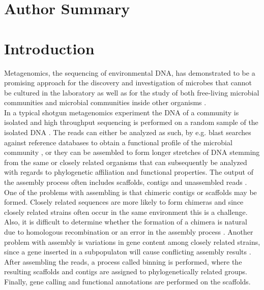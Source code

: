 \section*{Author Summary}



\section*{Introduction}
Metagenomics, the sequencing of environmental DNA, has demonstrated to be a
promising approach for the discovery and investigation of microbes that cannot
be cultured in the laboratory \cite{Eisen17355177} as well as for the study of
both free-living microbial communities \cite{Andersson18497291} and microbial
communities inside other organisms \cite{Qin20203603,Hess21273488}.\\


In a typical shotgun metagenomics experiment the DNA of a community is isolated
and high throughput sequencing is performed on a random sample of the isolated
DNA \cite{Morgan20419134}. The reads can either be analyzed as such, by e.g.
blast searches against reference databases to obtain a functional profile of
the microbial community \cite{Tringe15845853}, or they can be assembled to form
longer stretches of DNA stemming from the same or closely related organisms
that can subsequently be analyzed with regards to phylogenetic affiliation and
functional properties. The output of the assembly process often includes
scaffolds, contigs and unassembled reads \cite{Mavromatis17468765}. One of the
problems with assembling is that chimeric contigs or scaffolds may be formed.
Closely related sequences are more likely to form chimeras and since closely
related strains often occur in the same environment this is a challenge. Also,
it is difficult to determine whether the formation of a chimera is natural due
to homologous recombination or an error in the assembly process
\cite{Tyson14961025}. Another problem with assembly is variations in gene
content among closely related strains, since a gene inserted in a subpopulaton
will cause conflicting assembly results \cite{Hallam17114289}. After assembling
the reads, a process called binning is performed, where the resulting scaffolds
and contigs are assigned to phylogenetically related groups. Finally, gene
calling and functional annotations are performed on the scaffolds.\\

